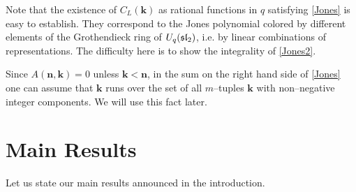 \documentclass[12pt]{amsart}
\theoremstyle{plain}
\theoremstyle{definition}
\newcommand{\qbinom}[2]{\text{$\left[\begin{array}{c}#1\\ #2\end{array}
\right]$}}
\def\BZ{\mathbb Z}
\def\bn{{\mathbf n}}
\def\Z{\BZ}
\def\bk{\mathbf{k}}
\def\ev{\mathrm{ev}}
\begin{document}
 Note that the existence of $C_{L}(\bk)$ as
rational functions in $q$ satisfying \eqref{Jones} is
 easy to establish. They correspond to the Jones polynomial
colored by different elements of the Grothendieck ring
of $U_q(\frak {sl}_2)$, i.e. by linear combinations of representations.
The difficulty here is to show the integrality
of \eqref{Jones2}.

 Since $A(\bn, \bk) =0$ unless $ \bk < \bn$, in the sum on the right
hand side of \eqref{Jones} one can assume that $\bk$ runs over the set
 of all $m$--tuples $\bk$ with non--negative integer components. We will use
this fact later.














\section{Main Results}
\label{strategy}
Let us state our main results announced in the introduction.


\end{document}
